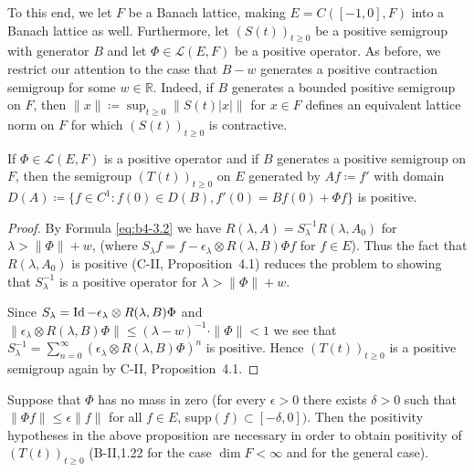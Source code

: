 To this end, we let $F$ be a Banach lattice, making $E = C([-1,0],F)$ into a Banach lattice as well. 
Furthermore, let $(S(t))_{t \geq 0}$ be a positive semigroup with generator $B$ and let $\Phi \in \mathcal{L}(E,F)$ be a positive operator. 
As before, we restrict our attention to the case that $B - w$ generates a positive contraction semigroup for some $w \in \mathbb{R}$. 
Indeed, if $B$ generates a bounded positive semigroup on $F$, then $\|x\|  \coloneq  \sup_{t \geq 0}\|S(t)|x|\|$ for $x \in F$ defines an equivalent lattice norm on $F$ for which $(S(t))_{t \geq 0}$ is contractive.
\begin{proposition}\label{prop:b4-3.5}
%
%
	If $\Phi \in \mathcal{L}(E,F)$ is a positive operator and if $B$ generates a positive semigroup on $F$, then the semigroup $(T(t))_{t \geq 0}$ on $E$ generated by $Af  \coloneq  f'$ with domain $D(A)  \coloneq  \{f \in C^1 \colon f(0) \in D(B), f'(0) = Bf(0) + \Phi f\}$ is positive.
\end{proposition}
\begin{proof} By Formula \eqref{eq:b4-3.2} we have $R(\lambda,A) = S_\lambda^{-1}R(\lambda,A_{0})$ for $\lambda > \|\Phi\|+w$, (where $S_\lambda f = f - \epsilon_\lambda \otimes R(\lambda,B)\Phi f$ for $f \in E$). 
Thus the fact that $R(\lambda,A_{0})$ is positive (C-II, Proposition~4.1) reduces the problem to showing that $S_\lambda^{-1}$ is a positive operator for $\lambda > \|\Phi\|+w$.

Since $S_\lambda = \operatorname{Id}  - \epsilon_\lambda \otimes R(\lambda,B)\Phi$ and $\|\epsilon_\lambda \otimes R(\lambda,B)\Phi\| \leq (\lambda-w)^{-1} \cdot \|\Phi\| < 1$ we see that $S_\lambda^{-1} = \sum_{n=0}^{\infty}(\epsilon_\lambda \otimes R(\lambda,B)\Phi)^n$ is positive. 
Hence $(T(t))_{t \geq 0}$ is a positive semigroup again by C-II, Proposition~4.1.
\end{proof}
\begin{remark*}
Suppose that $\Phi$ has no mass in zero (\ie  for every $\epsilon > 0$ there exists $\delta > 0$ such that $\|\Phi f\| \leq \epsilon \|f\|$ for all $f \in E$, supp$(f) \subset [-\delta,0])$. 
Then the positivity hypotheses in the above proposition are necessary in order to obtain positivity of $(T(t))_{t \geq 0}$ (\cf B-II,1.22 for the case $\dim F < \infty$ and \citet{kerscher:1986} for the general case).
\end{remark*}
